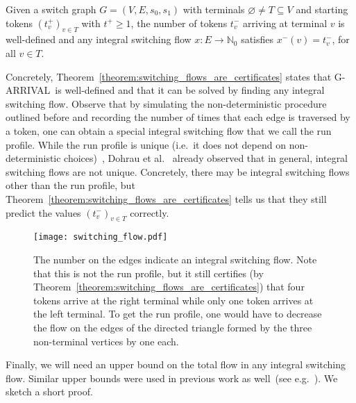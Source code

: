 \documentclass[a4paper,UKenglish,cleveref, autoref, thm-restate]{lipics-v2021}
\newcommand{\N}{\mathbb{N}}
\let\emptyset\varnothing
\newcommand{\problem}[1]{\textrm{#1}}
\newcommand{\garrival}{\problem{G-ARRIVAL}}
\begin{document}
\begin{theorem}
\label{theorem:switching_flows_are_certificates}
    Given a switch graph $G = (V, E, s_0, s_1)$ with terminals $\emptyset \neq T \subseteq V$ and starting tokens $(t^+_v)_{v \in T}$ with $t^+ \geq 1$, the number of tokens $t^-_v$ arriving at terminal $v$ is well-defined and any integral switching flow $x : E \rightarrow \N_0$ satisfies $x^-(v) = t^-_v$, for all $v \in T$.
\end{theorem}

Concretely, Theorem~\ref{theorem:switching_flows_are_certificates} states that \garrival\ is well-defined and that it can be solved by finding any integral switching flow. Observe that by simulating the non-deterministic procedure outlined before and recording the number of times that each edge is traversed by a token, one can obtain a special integral switching flow that we call the run profile. While the run profile is unique (i.e.\ it does not depend on non-deterministic choices)~\cite{gartnerSubexponentialAlgorithmARRIVAL2021}, Dohrau et al.\@~\cite{dohrauARRIVALZeroPlayerGraph2017} already observed that in general, integral switching flows are not unique. Concretely, there may be integral switching flows other than the run profile, but Theorem~\ref{theorem:switching_flows_are_certificates} tells us that they still predict the values $(t^-_v)_{v \in T}$ correctly. 

\begin{figure}[ht]
    \centering
    \texttt{[image: switching\_flow.pdf]}
    \caption{The number on the edges indicate an integral switching flow. Note that this is not the run profile, but it still certifies (by Theorem~\ref{theorem:switching_flows_are_certificates}) that four tokens arrive at the right terminal while only one token arrives at the left terminal. To get the run profile, one would have to decrease the flow on the edges of the directed triangle formed by the three non-terminal vertices by one each.}
    \label{fig:switching_flow}
\end{figure}

Finally, we will need an upper bound on the total flow in any integral switching flow. Similar upper bounds were used in previous work as well~(see e.g.\ \cite{dohrauARRIVALZeroPlayerGraph2017, gartnerARRIVALNextStop2018, gartnerSubexponentialAlgorithmARRIVAL2021, hoangTwoCombinatorialReconfiguration2022}). We sketch a short proof.
\end{document}
